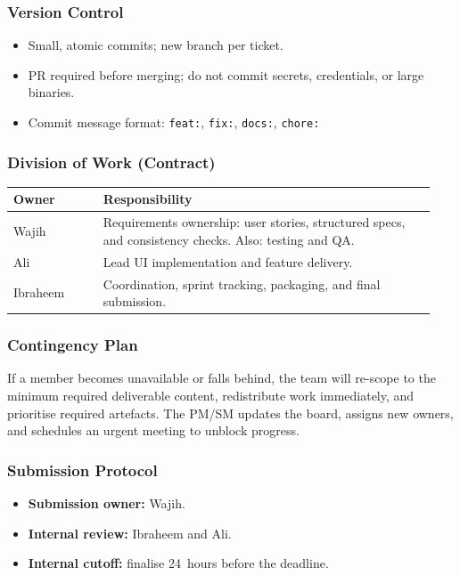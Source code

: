 \documentclass[12pt, a4paper]{article}
\begin{document}
\subsubsection*{Version Control}
\begin{itemize}
  \item Small, atomic commits; new branch per ticket.
  \item PR required before merging; do not commit secrets, credentials, or large binaries.
  \item Commit message format: \texttt{feat:}, \texttt{fix:}, \texttt{docs:}, \texttt{chore:}
\end{itemize}

\subsubsection*{Division of Work (Contract)}
\begin{center}
\begin{tabular}{@{}p{0.20\linewidth}p{0.74\linewidth}@{}}
  \toprule
  \textbf{Owner} & \textbf{Responsibility} \\
  \midrule
  Wajih     & Requirements ownership: user stories, structured specs, and consistency checks. Also: testing and QA. \\[3pt]
  Ali       & Lead UI implementation and feature delivery. \\[3pt]
  Ibraheem  & Coordination, sprint tracking, packaging, and final submission. \\
  \bottomrule
\end{tabular}
\end{center}

\subsubsection*{Contingency Plan}
If a member becomes unavailable or falls behind, the team will re-scope to the
minimum required deliverable content, redistribute work immediately, and
prioritise required artefacts. The PM/SM updates the board, assigns new owners,
and schedules an urgent meeting to unblock progress.

\subsubsection*{Submission Protocol}
\begin{itemize}
  \item \textbf{Submission owner:} Wajih.
  \item \textbf{Internal review:} Ibraheem and Ali.
  \item \textbf{Internal cutoff:} finalise 24~hours before the deadline.
\end{itemize}
\end{document}

